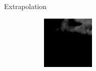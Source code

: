 \documentclass{beamer}
\begin{document}
\begin{frame}{Extrapolation}
\begin{figure}
\begin{subfigure}{.3\textwidth}
	    \end{subfigure}
	    \begin{subfigure}{.3\textwidth}
	        \centering
	        \includegraphics[width=\linewidth]{fig/extra/5.png}
	    \end{subfigure}
	\end{figure}
\end{frame}
\end{document}
